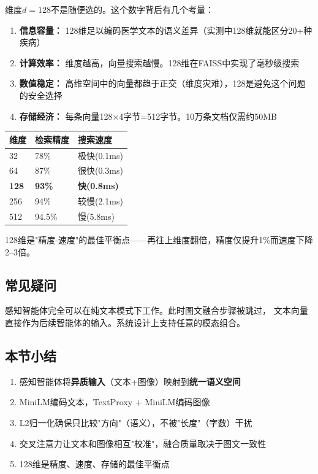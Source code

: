 \documentclass[11pt,a4paper]{ctexart}
\begin{document}
维度$d=128$不是随便选的。这个数字背后有几个考量：

\begin{enumerate}[nosep]
\item \textbf{信息容量：} 128维足以编码医学文本的语义差异（实测中128维就能区分20+种疾病）
\item \textbf{计算效率：} 维度越高，向量搜索越慢。128维在FAISS中实现了毫秒级搜索
\item \textbf{数值稳定：} 高维空间中的向量都趋于正交（维度灾难），128是避免这个问题的安全选择
\item \textbf{存储经济：} 每条向量128×4字节=512字节。10万条文档仅需约50MB
\end{enumerate}

\begin{exambox}[维度选择的实验对比]
\begin{tabular}{lll}
\toprule
\textbf{维度} & \textbf{检索精度} & \textbf{搜索速度} \\
\midrule
32 & 78\% & 极快(0.1ms) \\
64 & 87\% & 很快(0.3ms) \\
\textbf{128} & \textbf{93\%} & \textbf{快(0.8ms)} \\
256 & 94\% & 较慢(2.1ms) \\
512 & 94.5\% & 慢(5.8ms) \\
\bottomrule
\end{tabular}

128维是"精度-速度"的最佳平衡点——再往上维度翻倍，精度仅提升1\%而速度下降2--3倍。
\end{exambox}

\subsection{常见疑问}

\begin{warnbox}[如果输入只有文本没有图像怎么办？]
感知智能体完全可以在纯文本模式下工作。此时图文融合步骤被跳过，
文本向量直接作为后续智能体的输入。系统设计上支持任意的模态组合。
\end{warnbox}

\subsection{本节小结}

\begin{enumerate}[nosep]
\item 感知智能体将\textbf{异质输入}（文本+图像）映射到\textbf{统一语义空间}
\item MiniLM编码文本，TextProxy + MiniLM编码图像
\item L2归一化确保只比较"方向"（语义），不被"长度"（字数）干扰
\item 交叉注意力让文本和图像相互"校准"，融合质量取决于图文一致性
\item 128维是精度、速度、存储的最佳平衡点
\end{enumerate}
\end{document}
